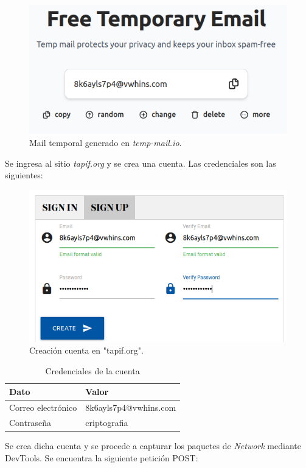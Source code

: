 \documentclass[letter,12pt]{article}
\begin{document}
\begin{figure}[H]
            \centering
            \includegraphics[width=0.8\linewidth]{tempmail.png}
        \caption{\label{fig:1}Mail temporal generado en \textit{temp-mail.io}.}
    \end{figure}

Se ingresa al sitio \textit{tapif.org} y se crea una cuenta. Las credenciales son las siguientes:

\begin{figure}[H]
            \centering
            \includegraphics[width=0.8\linewidth]{credenciales.png}
        \caption{\label{fig:2} Creación cuenta en "tapif.org".}
    \end{figure}

\begin{table}[h!]
\centering
\begin{tabular}{|l|l|}
\hline
\textbf{Dato}         & \textbf{Valor}                   \\ \hline
Correo electrónico    & 8k6ayls7p4@vwhins.com           \\ \hline
Contraseña            & criptografia                       \\ \hline
\end{tabular}
\caption{Credenciales de la cuenta}
\end{table}

Se crea dicha cuenta y se procede a capturar los paquetes de \textit{Network} mediante DevTools. Se encuentra la siguiente petición POST:
\end{document}
